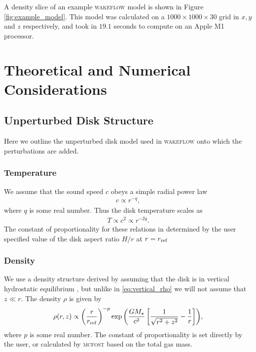 \noindent A density slice of an example \textsc{wakeflow} model is shown in Figure \ref{fig:example_model}.
This model was calculated on a $1000 \times 1000 \times 30$ grid in $x,y$ and $z$ respectively, and took in $19.1$ seconds to compute on an Apple M1 processor.

\section{Theoretical and Numerical Considerations} \label{sec:model_considerations}

\subsection{Unperturbed Disk Structure} \label{sec:diskstruct}

Here we outline the unperturbed disk model used in \textsc{wakeflow} onto which the perturbations are added.

\subsubsection{Temperature}

We assume that the sound speed $c$ obeys a simple radial power law 
\begin{align}
    c \propto r^{-q},
\end{align}
where $q$ is some real number. Thus the disk temperature scales as 
\begin{align}
    T \propto c^2 \propto r^{-2q}.
\end{align}
The constant of proportionality for these relations in determined by the user specified value of the disk aspect ratio $H/r$ at $r=r_{\rm ref}$

\subsubsection{Density}

We use a density structure derived by assuming that the disk is in vertical hydrostatic equilibrium \citep{pringle1981}, but unlike in \ref{eq:vertical_rho} we will not assume that $z\ll r$.
The density $\rho$ is given by 
\begin{align}
    \rho(r,z) \propto \left( \frac{r}{r_{\rm ref}} \right)^{-p} \exp{\left( \frac{G M_\star}{c^2} \left[ \frac{1}{\sqrt{r^2 + z^2}} - \frac{1}{r} \right] \right)},
\end{align}
where $p$ is some real number. 
The constant of proportionality is set directly by the user, or calculated by \textsc{mcfost} based on the total gas mass.

